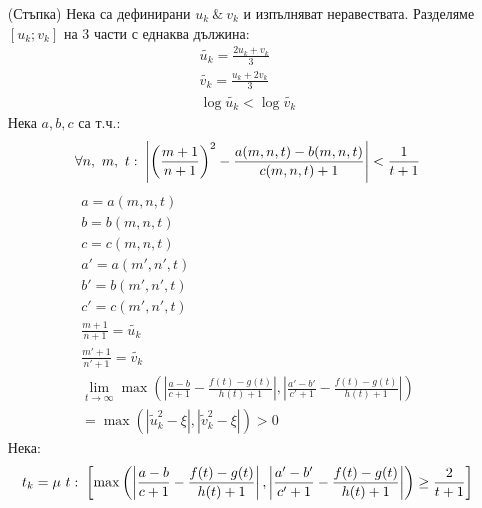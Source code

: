 \begin{solution}
\begin{itemize}
        \item[(Стъпка)] Нека са дефинирани $u_k\ \&\ v_k$ и изпълняват неравествата. Разделяме $[u_k;v_k]$ на 3 части с еднаква дължина:
            \begin{equation}
                \begin{split}
                    \tilde{u_k} = \frac{2u_k + v_k}{3} \\
                    \tilde{v_k} = \frac{u_k + 2v_k}{3} \\
                    \log \tilde{u_k} < \log \tilde{v_k}
                \end{split}
            \end{equation}
            Нека $a, b, c$ са т.ч.:
            \begin{equation}
                \forall n,\ m,\ t:\; \left|\left(\frac{m+1}{n+1}\right)^2 - \frac{a(m, n, t) - b(m, n, t)}{c(m, n, t) + 1}\right| <\frac{1}{t+1}
            \end{equation}
            \begin{equation}
                \begin{split}
                    a = a(m,n,t)\\
                    b = b(m,n,t)\\
                    c = c(m,n,t)\\
                    a' = a(m',n',t)\\
                    b' = b(m',n',t)\\
                    c' = c(m',n',t)\\
                    \frac{m+1}{n+1} = \tilde{u_k} \\
                    \frac{m'+1}{n'+1} = \tilde{v_k} \\
                    \lim_{t\to\infty} \max \left( \left| \frac{a - b}{c + 1} - \frac{f(t)-g(t)}{h(t) + 1} \right|,\left| \frac{a' - b'}{c' + 1} - \frac{f(t)-g(t)}{h(t) + 1} \right| \right) \\
                    = \max \left(|\tilde u_k^2- \xi|, |\tilde v_k^2- \xi|\right) > 0
                \end{split}
            \end{equation}
            Нека:
            \begin{equation}
                \begin{split}
                    t_k = \mu\ t:\; \left[\max\left(\abs{\frac{a - b}{c+1} - \frac{f(t)-g(t)}{h(t)+1}}, \abs{\frac{a' - b'}{c'+1} - \frac{f(t)-g(t)}{h(t)+1}}\right) \geq \frac{2}{t+1}\right] \\

\end{split}
\end{equation}
\end{itemize}
\end{solution}
